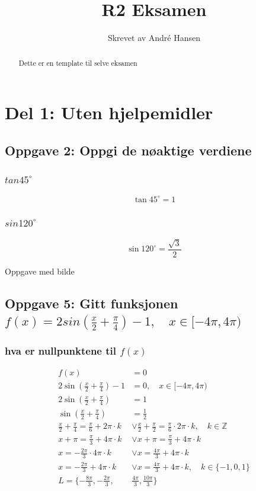 \documentclass{article}
\title{R2 Eksamen}
\author{Skrevet av André Hansen}
\begin{document}
\maketitle

\begin{abstract}
Dette er en template til selve eksamen
\end{abstract}

\section{Del 1: Uten hjelpemidler}

\subsection{Oppgave 2: Oppgi de nøaktige verdiene}

\subsubsection{$tan 45^{\circ}$}

$$\tan 45^{\circ} = 1$$

\subsubsection{$sin 120^{\circ}$}

$$\sin 120^{\circ} = \frac{\sqrt{3}}{2}$$

Oppgave med bilde

\subsection{Oppgave 5: Gitt funksjonen $f(x)=2sin(\frac{x}{2}+\frac{\pi}{4})-1, \quad x \in [-4\pi, 4\pi)$}

\subsubsection{hva er nullpunktene til $f(x)$}

\begin{align*}
    f(x) &= 0 \\
    2\sin(\frac{x}{2}+\frac{\pi}{4})-1 &= 0 , \quad x \in [-4\pi, 4\pi)  \\
    2\sin(\frac{x}{2}+\frac{\pi}{4}) &= 1 \\
    \sin(\frac{x}{2}+\frac{\pi}{4}) &= \frac{1}{2} \\
    \frac{x}{2} + \frac{\pi}{4} = \frac{\pi}{6} + 2\pi \cdot k  & \lor \frac{x}{2} + \frac{\pi}{2} = \frac{\pi}{6} \cdot 2\pi \cdot k, \quad k\in\mathbb{Z} \\
    x+\pi=\frac{\pi}{3} + 4\pi \cdot k &\lor x + \pi = \frac{\pi}{3} + 4\pi \cdot k \\
    x=-\frac{2\pi}{3} \cdot 4\pi \cdot k & \lor  x=\frac{4\pi}{3} + 4\pi \cdot k \\
    x=-\frac{2\pi}{3} + 4\pi \cdot k & \lor  x=\frac{4\pi}{3} + 4\pi \cdot k, \quad k \in \{ -1, 0, 1\} \\
    L= \{-\frac{8\pi}{3}, -\frac{2\pi}{3}, & \frac{4\pi}{3}, \frac{10\pi}{3} \}
\end{align*}
\end{document}
